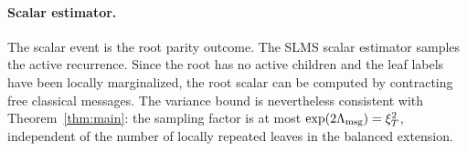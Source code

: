 \paragraph{Scalar estimator.}
The scalar event is the root parity outcome. The SLMS scalar estimator samples the active recurrence. Since the root has no active children and the leaf labels have been locally marginalized, the root scalar can be computed by contracting free classical messages. The variance bound is nevertheless consistent with Theorem~\ref{thm:main}: the sampling factor is at most \(\exp(2\Lambda_{\mathrm{msg}})=\xi_T^2\), independent of the number of locally repeated leaves in the balanced extension.
